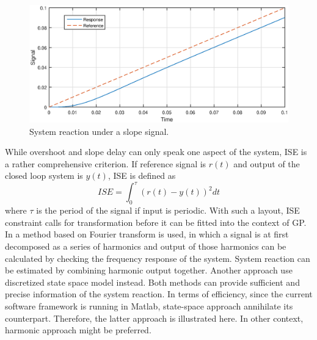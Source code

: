\begin{figure}[ht]
  \begin{center}
    \includegraphics[width=\linewidth]{Plots/slope_delay1.eps}
  \end{center}
  \caption{System reaction under a slope signal.}
  \label{fig:slope}
\end{figure}

While overshoot and slope delay can only speak one aspect of the system, ISE is a rather comprehensive criterion. If reference signal is $r(t)$ and output of the closed loop system is $y(t)$, ISE is defined as $$ ISE = \int_{0}^{\tau} (r(t)-y(t))^2dt$$ where $\tau$ is the period of the signal if input is periodic. With such a layout, ISE constraint calls for transformation before it can be fitted into the context of GP. In \cite{malmquist2015tool} a method based on Fourier transform is used, in which a signal is at first decomposed as a series of harmonics and output of those harmonics can be calculated by checking the frequency response of the system. System reaction can be estimated by combining harmonic output together. Another approach use discretized state space model instead. Both methods can provide sufficient and precise information of the system reaction. In terms of efficiency, since the current software framework is running in Matlab, state-space approach annihilate its counterpart. Therefore, the latter approach is illustrated here. In other context, harmonic approach might be preferred.

